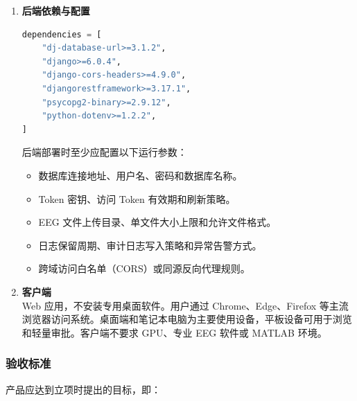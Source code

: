 \begin{enumerate}[(1)]
  \item \textbf{后端依赖与配置}\\
    \begin{lstlisting}[language=python]
dependencies = [
    "dj-database-url>=3.1.2",
    "django>=6.0.4",
    "django-cors-headers>=4.9.0",
    "djangorestframework>=3.17.1",
    "psycopg2-binary>=2.9.12",
    "python-dotenv>=1.2.2",
]
    \end{lstlisting}
    后端部署时至少应配置以下运行参数：
    \begin{itemize}
      \item 数据库连接地址、用户名、密码和数据库名称。
      \item Token 密钥、访问 Token 有效期和刷新策略。
      \item EEG 文件上传目录、单文件大小上限和允许文件格式。
      \item 日志保留周期、审计日志写入策略和异常告警方式。
      \item 跨域访问白名单（CORS）或同源反向代理规则。
    \end{itemize}

  \item \textbf{客户端}\\
  Web 应用，不安装专用桌面软件。用户通过 Chrome、Edge、Firefox 等主流浏览器访问系统。桌面端和笔记本电脑为主要使用设备，平板设备可用于浏览和轻量审批。客户端不要求 GPU、专业 EEG 软件或 MATLAB 环境。
\end{enumerate}

\subsubsection{验收标准}

产品应达到立项时提出的目标，即：

